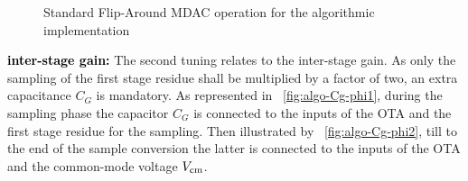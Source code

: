 \begin{figure}[htp]
\begin{subfigure}[b]{0.4\textwidth}
		\label{fig:algo-mdac-phi2}
	\end{subfigure}
	\caption{Standard Flip-Around MDAC operation for the algorithmic implementation}
	\label{fig:algo-mdac}
\end{figure}

\textbf{\textcolor{black}{inter-stage gain:}}
The second tuning relates to the inter-stage gain. As only the sampling of the first stage residue shall be multiplied by a factor of two, an extra capacitance \(C_G\) is mandatory. As represented in \figurename~\ref{fig:algo-Cg-phi1}, during the sampling phase the capacitor \(C_G\) is connected to the inputs of the OTA and the first stage residue for the sampling. Then illustrated by \figurename~\ref{fig:algo-Cg-phi2}, till to the end of the sample conversion the latter is connected to the inputs of the OTA and the common-mode voltage \(V_{\rm cm}\).

